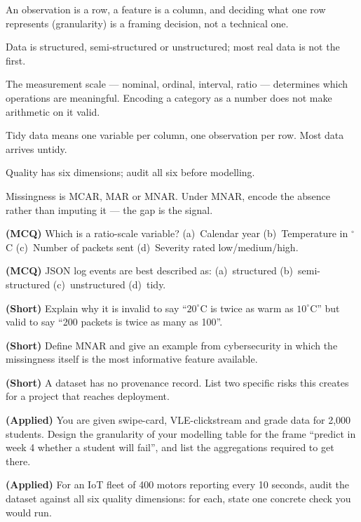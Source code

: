 \begin{chaptersummary}
\begin{tight}
  \item An observation is a row, a feature is a column, and deciding what one row
        represents (granularity) is a framing decision, not a technical one.
  \item Data is structured, semi-structured or unstructured; most real data is not
        the first.
  \item The measurement scale --- nominal, ordinal, interval, ratio --- determines
        which operations are meaningful. Encoding a category as a number does not
        make arithmetic on it valid.
  \item Tidy data means one variable per column, one observation per row. Most
        data arrives untidy.
  \item Quality has six dimensions; audit all six before modelling.
  \item Missingness is MCAR, MAR or MNAR. Under MNAR, encode the absence rather
        than imputing it --- the gap is the signal.
\end{tight}
\end{chaptersummary}

\begin{reviewq}
  \item \textbf{(MCQ)} Which is a ratio-scale variable? (a)~Calendar year
        (b)~Temperature in $^\circ$C (c)~Number of packets sent (d)~Severity rated
        low/medium/high.
  \item \textbf{(MCQ)} JSON log events are best described as: (a)~structured
        (b)~semi-structured (c)~unstructured (d)~tidy.
  \item \textbf{(Short)} Explain why it is invalid to say ``$20^\circ$C is twice as
        warm as $10^\circ$C'' but valid to say ``200 packets is twice as many as
        100''.
  \item \textbf{(Short)} Define MNAR and give an example from cybersecurity in
        which the missingness itself is the most informative feature available.
  \item \textbf{(Short)} A dataset has no provenance record. List two specific
        risks this creates for a project that reaches deployment.
  \item \textbf{(Applied)} You are given swipe-card, VLE-clickstream and grade data
        for 2{,}000 students. Design the granularity of your modelling table for the
        frame ``predict in week 4 whether a student will fail'', and list the
        aggregations required to get there.
  \item \textbf{(Applied)} For an IoT fleet of 400 motors reporting every 10
        seconds, audit the dataset against all six quality dimensions: for each,
        state one concrete check you would run.
\end{reviewq}
